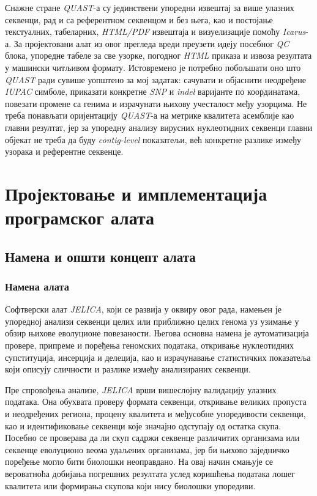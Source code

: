 \documentclass[12pt,oneside]{memoir}
\begin{document}
Снажне стране \textit{QUAST}-а су јединствени упоредни извештај за више улазних секвенци, рад и са референтном секвенцом и без њега, као и постојање текстуалних, табеларних, \textit{HTML/PDF} извештаја и визуелизације помоћу \textit{Icarus}-а. За пројектовани алат из овог прегледа вреди преузети идеју посебног \textit{QC} блока, упоредне табеле за све узорке, погодног \textit{HTML} приказа и извоза резултата у машински читљивом формату. Истовремено је потребно побољшати оно што \textit{QUAST} ради сувише уопштено за мој задатак: сачувати и објаснити неодређене \textit{IUPAC} симболе, приказати конкретне \textit{SNP} и \textit{indel} варијанте по координатама, повезати промене са генима и израчунати њихову учесталост међу узорцима. Не треба понављати оријентацију \textit{QUAST}-а на метрике квалитета асемблије као главни резултат, јер за упоредну анализу вирусних нуклеотидних секвенци главни објекат не треба да буду \textit{contig-level} показатељи, већ конкретне разлике између узорака и референтне секвенце.


\chapter{Пројектовање и имплементација програмског алата}
\section{Намена и општи концепт алата}
\subsection{Намена алата}
Софтверски алат \textit{JELICA}, који се развија у оквиру овог рада, намењен је упоредној анализи секвенци целих или приближно целих генома уз узимање у обзир њихове еволуционе повезаности. Његова основна намена је аутоматизација провере, припреме и поређења геномских података, откривање нуклеотидних супституција, инсерција и делеција, као и израчунавање статистичких показатеља који описују сличности и разлике између анализираних секвенци.

Пре спровођења анализе, \textit{JELICA} врши вишеслојну валидацију улазних података. Она обухвата проверу формата секвенци, откривање великих пропуста и неодређених региона, процену квалитета и међусобне упоредивости секвенци, као и идентификовање секвенци које значајно одступају од остатка скупа. Посебно се проверава да ли скуп садржи секвенце различитих организама или секвенце еволуционо веома удаљених организама, јер би њихово заједничко поређење могло бити биолошки неоправдано. На овај начин смањује се вероватноћа добијања погрешних резултата услед коришћења података лошег квалитета или формирања скупова који нису биолошки упоредиви.
\end{document}
